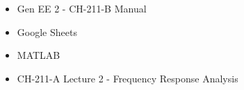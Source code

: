\begin{itemize}
    \item Gen EE 2 - CH-211-B Manual
    \item Google Sheets
    \item MATLAB
    \item CH-211-A Lecture 2 - Frequency Response Analysis
\end{itemize}